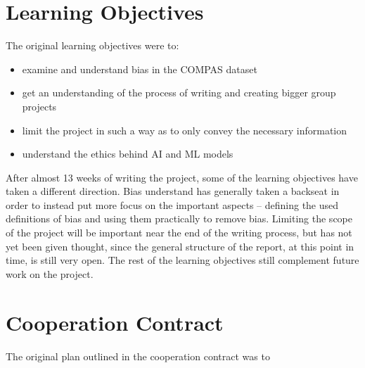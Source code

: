 \documentclass[11pt, fleqn]{article}
\begin{document}
	\section*{Learning Objectives}
	The original learning objectives were to:
	\begin{itemize}
		\itemsep-0.1cm
		\item examine and understand bias in the COMPAS dataset
		\item get an understanding of the process of writing and creating bigger group projects
		\item limit the project in such a way as to only convey the necessary information
		\item understand the ethics behind AI and ML models
	\end{itemize}
	
	After almost 13 weeks of writing the project, some of the learning objectives have taken a different direction. Bias understand has generally taken a backseat in order to instead put more focus on the important aspects – defining the used definitions of bias and using them practically to remove bias. Limiting the scope of the project will be important near the end of the writing process, but has not yet been given thought, since the general structure of the report, at this point in time, is still very open. The rest of the learning objectives still complement future work on the project.
	
	\section*{Cooperation Contract}
	The original plan outlined in the cooperation contract was to
	
	
\end{document}
